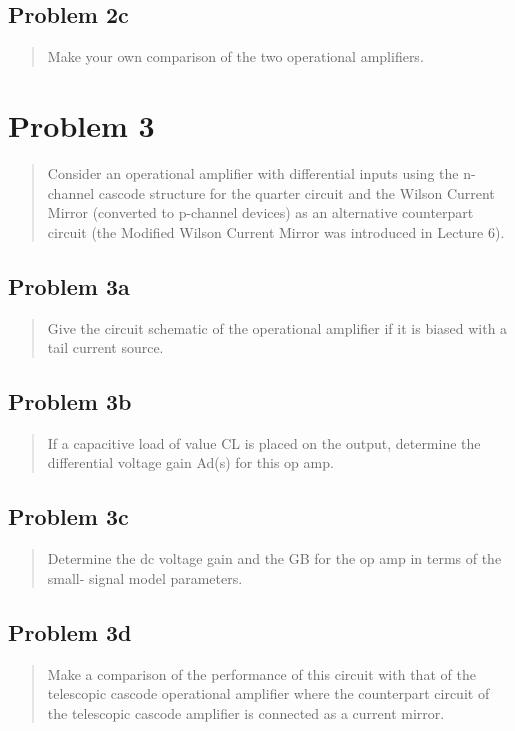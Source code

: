 \documentclass[10pt,a4paper]{article}
\let\oldsubsection\subsection
\renewcommand{\subsection}{%
    \setcounter{equation}{0}%
    \oldsubsection%
}
\begin{document}
\subsection{Problem 2c}
\begin{quote}
Make your own comparison of the two operational amplifiers.\\
\end{quote}




\section{Problem 3}
\begin{quote}
Consider an operational amplifier with differential inputs using the n-
channel cascode structure for the quarter circuit and the Wilson Current Mirror
(converted to p-channel devices) as an alternative counterpart circuit (the Modified
Wilson Current Mirror was introduced in Lecture 6).\\
\end{quote}

\subsection{Problem 3a}
\begin{quote}
Give the circuit schematic of the operational amplifier if it is biased with a tail
current source.
\end{quote}

\subsection{Problem 3b}
\begin{quote}
If a capacitive load of value CL is placed on the output, determine the differential
voltage gain Ad(s) for this op amp.
\end{quote}

\subsection{Problem 3c}
\begin{quote}
Determine the dc voltage gain and the GB for the op amp in terms of the small-
signal model parameters.
\end{quote}


\subsection{Problem 3d}
\begin{quote}
Make a comparison of the performance of this circuit with that of the telescopic
cascode operational amplifier where the counterpart circuit of the telescopic
cascode amplifier is connected as a current mirror.
\end{quote}
\end{document}
